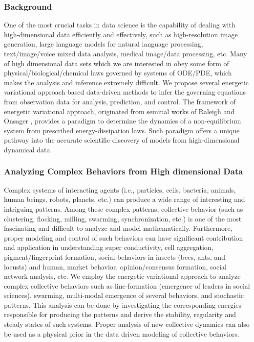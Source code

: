 \documentclass[11pt]{NSFamsart}
\begin{document}
\subsubsection*{Background} One of the most crucial tasks in data science is the capability of dealing with high-dimensional data efficiently and effectively, such as high-resolution image generation, large language models for natural language processing, text/image/voice mixed data analysis, medical image/data processing, etc.  Many of high dimensional data sets which we are interested in obey some form of physical/biological/chemical laws governed by systems of ODE/PDE, which makes the analysis and inference extremely difficult.  We propose several energetic variational approach based data-driven methods to infer the governing equations from observation data for analysis, prediction, and control.  The framework of energetic variational approach, originated from seminal works of Raleigh \cite{strutt1871some} and Onsager \cite{onsager1931reciprocal,onsager1931reciprocal2}, provides a paradigm to determine the dynamics of a non-equilibrium system from prescribed energy-dissipation laws.  Such paradigm offers a unique pathway into the accurate scientific discovery of models from high-dimensional dynamical data. 

\subsubsection*{Analyzing Complex Behaviors from High dimensional Data}
Complex systems of interacting agents (i.e., particles, cells, bacteria, animals, human beings, robots, planets, etc.) %
can produce a wide range of interesting and intriguing patterns.  Among these complex patterns, collective behavior (such as clustering, flocking, milling, swarming, synchronization, etc.) is one of the most fascinating and difficult to analyze and model mathematically.  Furthermore, proper modeling and control of such behaviors can have significant contribution and application in understanding super conductivity, cell aggregation, pigment/fingerprint formation, social behaviors in insects (bees, ants, and locusts) and human, market behavior, opinion/consensus formation, social network analysis, etc. We employ the energetic variational approach to analyze complex collective behaviors such as line-formation (emergence of leaders in social sciences), swarming, multi-modal emergence of several behaviors, and stochastic patterns.  This analysis can be done by investigating the corresponding energies responsible for producing the patterns and derive the stability, regularity and steady states of such systems.  Proper analysis of new collective dynamics can also be used as a physical prior in the data driven modeling of collective behaviors.
\end{document}
